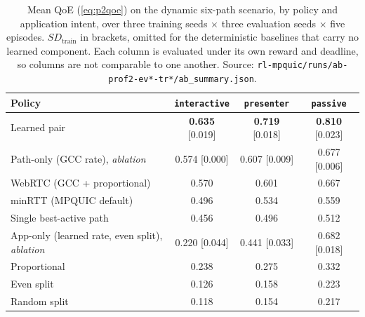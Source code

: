 \begin{table}[t]
  \centering
  \caption[Mean QoE on the dynamic six-path scenario]{Mean QoE (\cref{eq:p2qoe}) on the dynamic six-path scenario, by policy and application
  intent, over three training seeds $\times$ three evaluation seeds $\times$ five episodes.
  $\mathit{SD}_{\mathrm{train}}$ in brackets, omitted for the deterministic baselines that carry no
  learned component. Each column is evaluated under its own reward and deadline, so columns are not
  comparable to one another. Source: \texttt{rl-mpquic/runs/ab-prof2-ev*-tr*/ab\_summary.json}.}
  \label{tab:p2results}
  \small
  \begin{tabular}{lccc}
    \toprule
    Policy & \texttt{interactive} & \texttt{presenter} & \texttt{passive} \\
    \midrule
    Learned pair              & \textbf{0.635} [0.019] & \textbf{0.719} [0.018] & \textbf{0.810} [0.023] \\
    Path-only (GCC rate), \emph{ablation} & 0.574 [0.000] & 0.607 [0.009] & 0.677 [0.006] \\
    WebRTC (GCC + proportional) & 0.570 & 0.601 & 0.667 \\
    minRTT (MPQUIC default)   & 0.496 & 0.534 & 0.559 \\
    Single best-active path   & 0.456 & 0.496 & 0.512 \\
    App-only (learned rate, even split), \emph{ablation} & 0.220 [0.044] & 0.441 [0.033] & 0.682 [0.018] \\
    Proportional              & 0.238 & 0.275 & 0.332 \\
    Even split                & 0.126 & 0.158 & 0.223 \\
    Random split              & 0.118 & 0.154 & 0.217 \\
    \bottomrule
  \end{tabular}
\end{table}

